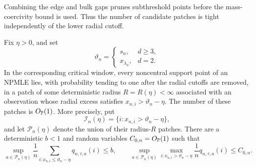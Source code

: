 Combining the edge and bulk gaps prunes subthreshold points before the
mass-coercivity bound is used. Thus the number of candidate patches is tight
independently of the lower radial cutoff.
\begin{proposition}
\label{prop:support-threshold-pruning}
Fix \(\eta>0\), and set
\[
    \vartheta_n=
    \begin{cases}
       s_n,&d\ge3,\\
       x_{\lambda_n},&d=2.
    \end{cases}
\]
In the corresponding critical window, every noncentral support point of an
NPMLE lies, with probability tending to one after the radial
cutoffs are removed, in a patch of some deterministic radius
\(R=R(\eta)<\infty\) associated with an observation whose radial excess
satisfies \(x_{n,i}>\vartheta_n-\eta\). The number of these patches is
\(O_{\mathbb P}(1)\). More precisely, put
\[
 \mathcal I_n(\eta)=\{i:x_{n,i}>\vartheta_n-\eta\},
\]
and let \(\mathcal P_n(\eta)\) denote the union of their radius-\(R\) patches.
There are a deterministic \(b<1\) and
random variables \(C_{0,n}=O_{\mathbb P}(1)\) such that
\[
 \sup_{a\in\mathcal P_n(\eta)}
 \frac1n\sum_{i:x_{n,i}\le\vartheta_n-\eta}
 q_{n,\tau,a}(i)\le b,
 \qquad
 \sup_{a\in\mathcal P_n(\eta)}
 \max_{i:x_{n,i}>\vartheta_n-\eta}
 \frac1nq_{n,\tau,a}(i)\le C_{0,n}.
\]
\end{proposition}

